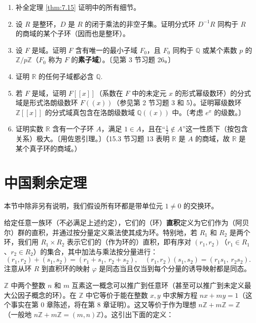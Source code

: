 \begin{enumerate}
\item 补全定理 \ref{thm:7.15} 证明中的所有细节。

\item 设 \(R\) 是整环，\(D\) 是 \(R\) 的闭于乘法的非空子集。证明分式环 \(D^{-1}R\) 同构于 \(R\) 的商域的某个子环（因而也是整环）。

\item 设 \(F\) 是域。证明 \(F\) 含有唯一的最小子域 \(F_0\)，且 \(F_0\) 同构于 \(\mathbb{Q}\) 或某个素数 \(p\) 的 \(\mathbb{Z}/p\mathbb{Z}\)（\(F_0\) 称为 \(F\) 的\textbf{素子域}）。〔见第 3 节习题 26。〕

\item 证明 \(\mathbb{R}\) 的任何子域都必含 \(\mathbb{Q}\).

\item 若 \(F\) 是域，证明 \(F[[x]]\)（系数在 \(F\) 中的未定元 \(x\) 的形式幂级数环）的分式域是形式洛朗级数环 \(F((x))\)（参见第 2 节习题 3 和 5）。证明幂级数环 \(\mathbb{Z}[[x]]\) 的分式域真包含在洛朗级数域 \(\mathbb{Q}((x))\) 中。〔考虑 \(e^x\) 的级数。〕

\item 证明实数 \(\mathbb{R}\) 含有一个子环 \(A\)，满足 \(1 \in A\)，且在“\(\frac{1}{2} \notin A\)”这一性质下（按包含关系）极大。〔用佐恩引理。〕（15.3 节习题 13 表明 \(\mathbb{R}\) 是 \(A\) 的商域，故 \(\mathbb{R}\) 是某个真子环的商域。）
\end{enumerate}

\section{中国剩余定理}

本节中除非另有说明，我们假设所有环都是带单位元 \(1 \neq 0\) 的交换环。

给定任意一族环（不必满足上述约定），它们的（环）\textbf{直积}定义为它们作为（阿贝尔）群的直积，并通过按分量定义乘法使其成为环。特别地，若 \(R_1\) 和 \(R_2\) 是两个环，我们用 \(R_1 \times R_2\) 表示它们的（作为环的）直积，即有序对 \((r_1, r_2)\)（\(r_1 \in R_1\)、\(r_2 \in R_2\)）的集合，其中加法与乘法按分量进行：
\[
(r_1, r_2) + (s_1, s_2) = (r_1+s_1,\ r_2+s_2), \quad (r_1, r_2)(s_1, s_2) = (r_1s_1,\ r_2s_2).
\]
注意从环 \(R\) 到直积环的映射 \(\varphi\) 是同态当且仅当到每个分量的诱导映射都是同态。

\(\mathbb{Z}\) 中两个整数 \(n\) 和 \(m\) 互素这一概念可以推广到任意环（甚至可以推广到未定义最大公因子概念的环）。在 \(\mathbb{Z}\) 中它等价于能在整数 \(x, y\) 中求解方程 \(nx + my = 1\)（这个事实在第 0 章陈述，将在第 8 章证明）。这又等价于作为理想 \(n\mathbb{Z} + m\mathbb{Z} = \mathbb{Z}\)（一般地 \(n\mathbb{Z} + m\mathbb{Z} = (m, n)\mathbb{Z}\)）。这引出下面的定义：

